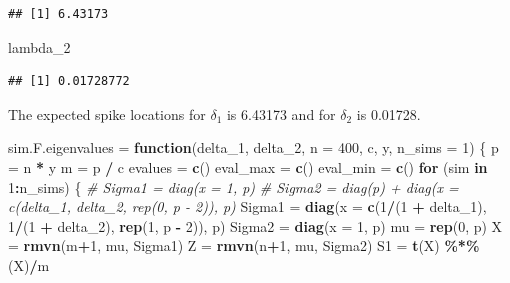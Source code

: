 \documentclass[
]{article}
\newenvironment{Shaded}{\begin{snugshade}}{\end{snugshade}}
\newcommand{\AttributeTok}[1]{\textcolor[rgb]{0.13,0.29,0.53}{#1}}
\newcommand{\CommentTok}[1]{\textcolor[rgb]{0.56,0.35,0.01}{\textit{#1}}}
\newcommand{\ControlFlowTok}[1]{\textcolor[rgb]{0.13,0.29,0.53}{\textbf{#1}}}
\newcommand{\DecValTok}[1]{\textcolor[rgb]{0.00,0.00,0.81}{#1}}
\newcommand{\FunctionTok}[1]{\textcolor[rgb]{0.13,0.29,0.53}{\textbf{#1}}}
\newcommand{\NormalTok}[1]{#1}
\newcommand{\OtherTok}[1]{\textcolor[rgb]{0.56,0.35,0.01}{#1}}
\newcommand{\SpecialCharTok}[1]{\textcolor[rgb]{0.81,0.36,0.00}{\textbf{#1}}}
\begin{document}
\begin{verbatim}
## [1] 6.43173
\end{verbatim}

\begin{Shaded}
\begin{Highlighting}[]
\NormalTok{lambda\_2}
\end{Highlighting}
\end{Shaded}

\begin{verbatim}
## [1] 0.01728772
\end{verbatim}

The expected spike locations for \(\delta_1\) is 6.43173 and for
\(\delta_2\) is 0.01728.

\begin{Shaded}
\begin{Highlighting}[]
\NormalTok{sim.F.eigenvalues }\OtherTok{=} \ControlFlowTok{function}\NormalTok{(delta\_1, delta\_2, }\AttributeTok{n =} \DecValTok{400}\NormalTok{, c, y, }\AttributeTok{n\_sims =} \DecValTok{1}\NormalTok{) \{}
\NormalTok{  p }\OtherTok{=}\NormalTok{ n }\SpecialCharTok{*}\NormalTok{ y}
\NormalTok{  m }\OtherTok{=}\NormalTok{ p }\SpecialCharTok{/}\NormalTok{ c}
\NormalTok{  evalues }\OtherTok{=} \FunctionTok{c}\NormalTok{()}
\NormalTok{  eval\_max }\OtherTok{=} \FunctionTok{c}\NormalTok{()}
\NormalTok{  eval\_min }\OtherTok{=} \FunctionTok{c}\NormalTok{()}
  \ControlFlowTok{for}\NormalTok{ (sim }\ControlFlowTok{in} \DecValTok{1}\SpecialCharTok{:}\NormalTok{n\_sims) \{}
    \CommentTok{\# Sigma1 = diag(x = 1, p)}
    \CommentTok{\# Sigma2 = diag(p) + diag(x = c(delta\_1, delta\_2, rep(0, p {-} 2)), p)}
\NormalTok{    Sigma1 }\OtherTok{=} \FunctionTok{diag}\NormalTok{(}\AttributeTok{x =} \FunctionTok{c}\NormalTok{(}\DecValTok{1}\SpecialCharTok{/}\NormalTok{(}\DecValTok{1} \SpecialCharTok{+}\NormalTok{ delta\_1), }\DecValTok{1}\SpecialCharTok{/}\NormalTok{(}\DecValTok{1} \SpecialCharTok{+}\NormalTok{ delta\_2), }\FunctionTok{rep}\NormalTok{(}\DecValTok{1}\NormalTok{, p }\SpecialCharTok{{-}} \DecValTok{2}\NormalTok{)), p)}
\NormalTok{    Sigma2 }\OtherTok{=} \FunctionTok{diag}\NormalTok{(}\AttributeTok{x =} \DecValTok{1}\NormalTok{, p)}
\NormalTok{    mu }\OtherTok{=} \FunctionTok{rep}\NormalTok{(}\DecValTok{0}\NormalTok{, p)}
\NormalTok{    X }\OtherTok{=} \FunctionTok{rmvn}\NormalTok{(m}\SpecialCharTok{+}\DecValTok{1}\NormalTok{, mu, Sigma1)}
\NormalTok{    Z }\OtherTok{=} \FunctionTok{rmvn}\NormalTok{(n}\SpecialCharTok{+}\DecValTok{1}\NormalTok{, mu, Sigma2)}
\NormalTok{    S1 }\OtherTok{=} \FunctionTok{t}\NormalTok{(X) }\SpecialCharTok{\%*\%}\NormalTok{ (X)}\SpecialCharTok{/}\NormalTok{m}

\end{Highlighting}
\end{Shaded}
\end{document}
